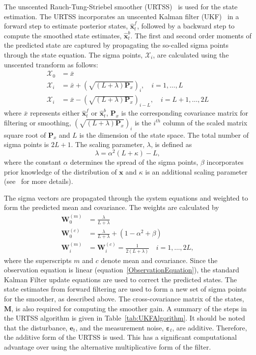\documentclass[10pt]{article}
\begin{document}
The unscented Rauch-Tung-Striebel smoother (URTSS)~\cite{Sarkka2010} is used for the state estimation. The URTSS incorporates an unscented Kalman filter (UKF)~\cite{Julier1997, Merwe2003} in a forward step to estimate posterior states, $\hat{\mathbf x}_t^{f}$, followed by a backward step to compute the smoothed state estimates, $\hat{\mathbf x}_t^{b}$. The first and second order moments of the predicted state are captured by propagating the so-called sigma points through the state equation. The sigma points, $\mathcal X_i$, are calculated using the unscented transform as follows:
\begin{align}\label{eq:sigmapoints1}
	\mathcal X_{0}&=\bar x \\
	\mathcal X_{i}&=\bar x+\left(\sqrt{( L + \lambda)\mathbf P_x}\right)_i, \quad i=1, \dots, L \\
	\mathcal X_{i}&=\bar x-\left(\sqrt{( L + \lambda)\mathbf P_x}\right)_{i- L}, \quad i= L+1, \dots, 2L 
\end{align}
where $\bar x$ represents either $\hat{\mathbf x}_t^{f}$ or $\hat{\mathbf x}_t^{b}$, $\mathbf{P}_x$ is the corresponding covariance matrix for filtering or smoothing, $\left(\sqrt{( L + \lambda)\mathbf P_x}\right)_i$ is the $i^{th}$ column of the scaled matrix square root of $\mathbf P_x$ and $L$ is the dimension of the state space. The total number of sigma points is $2L+1$. The scaling parameter, $\lambda$, is defined as 
\begin{equation}\label{eq:sigmapoints3}
	\lambda=\alpha^2( L+\kappa) - L, 
\end{equation}
where the constant $\alpha$ determines the spread of the sigma points, $\beta$ incorporates prior knowledge of the distribution of $\mathbf{x}$ and $\kappa$ is an additional scaling parameter (see~\cite{Haykin2001} for more details). 

The sigma vectors are propagated through the system equations and weighted to form the predicted mean and covariance. The weights are calculated by 
\begin{align}
	\mathbf W_0^{(m)}&=\frac{\lambda}{ L+\lambda} \\
	\mathbf W_0^{(c)}&=\frac{\lambda}{ L+\lambda}+(1-\alpha^2+\beta) \\
	\mathbf W_i^{(m)}&=\mathbf W_i^{(c)}=\frac{1}{2( L+\lambda)} \quad i=1, \dots, 2L, 
\end{align}
where the superscripts $m$ and $c$ denote mean and covariance. Since the observation equation is linear (equation~\ref{ObservationEquation}), the standard Kalman Filter update equations are used to correct the predicted states. The state estimates from forward filtering are used to form a new set of sigma points for the smoother, as described above. The cross-covariance matrix of the states, $\mathbf M$, is also required for computing the smoother gain. A summary of the steps in the URTSS algorithm is given in Table~\ref{tab:UKFAlgorithm}. It should be noted that the disturbance, $\mathbf{e}_t$, and the measurement noise, $\boldsymbol{\varepsilon}_t$, are additive. Therefore, the additive form of the URTSS is used. This has a significant computational advantage over using the alternative multiplicative form of the filter. 
\end{document}
